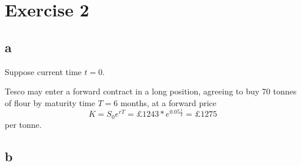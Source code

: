 \documentclass{article}
\begin{document}
\title{}
\author{Li Yueheng s2306706}

\maketitle


\section*{Exercise 2}
\subsection*{a}
Suppose current time $t=0$.

Tesco may enter a forward contract in a long position, agreeing to buy 70 tonnes of flour by maturity time $T= 6$ months, at a forward price 
$$K=S_0e^{rT}=\pounds 1243*e^{0.05\frac{1}{2}}=\pounds 1275$$
per tonne.

\subsection*{b}
\end{document}
